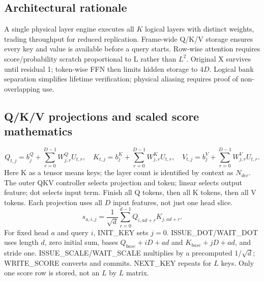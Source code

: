 \documentclass[11pt,a4paper]{article}
\begin{document}
\subsection{Architectural rationale}
A single physical layer engine executes all $K$ logical layers with distinct weights, trading throughput for reduced replication. Frame-wide Q/K/V storage ensures every key and value is available before a query starts. Row-wise attention requires score/probability scratch proportional to L rather than $L^2$. Original X survives until residual 1; token-wise FFN then limits hidden storage to $4D$. Logical bank separation simplifies lifetime verification; physical aliasing requires proof of non-overlapping use.

\subsection{Q/K/V projections and scaled score mathematics}
\[
Q_{t,j}=b^Q_j+\sum_{r=0}^{D-1}W^Q_{j,r}U_{t,r},\quad
K_{t,j}=b^K_j+\sum_{r=0}^{D-1}W^K_{j,r}U_{t,r},\quad
V_{t,j}=b^V_j+\sum_{r=0}^{D-1}W^V_{j,r}U_{t,r}.
\]
Here K as a tensor means keys; the layer count is identified by context as $N_{dec}$. The outer QKV controller selects projection and token; linear selects output feature; dot selects input term. Finish all Q tokens, then all K tokens, then all V tokens. Each projection uses all $D$ input features, not just one head slice.
\[
s_{a,i,j}=\frac{1}{\sqrt d}\sum_{r=0}^{d-1}Q_{i,ad+r}K_{j,ad+r}.
\]
For fixed head $a$ and query $i$, INIT\_KEY sets $j=0$. ISSUE\_DOT/WAIT\_DOT uses length $d$, zero initial sum, bases $Q_{base}+iD+ad$ and $K_{base}+jD+ad$, and stride one. ISSUE\_SCALE/WAIT\_SCALE multiplies by a precomputed $1/\sqrt d$; WRITE\_SCORE converts and commits. NEXT\_KEY repeats for $L$ keys. Only one score row is stored, not an $L$ by $L$ matrix.

\begin{center}
\end{center}
\end{document}
